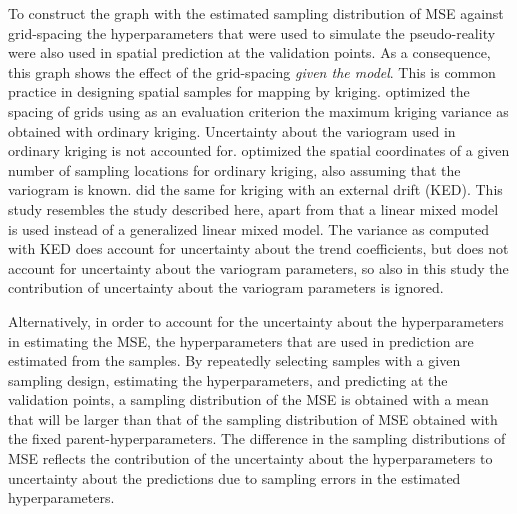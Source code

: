 \documentclass[review]{elsarticle}
\begin{document}
To construct the graph with the estimated sampling distribution of MSE against grid-spacing the hyperparameters that were used to simulate the pseudo-reality were also used in spatial prediction at the validation points. As a consequence, this graph shows the effect of the grid-spacing \emph{given the model}. This is common practice in designing spatial samples for mapping by kriging. \citet{mcbratney1981} optimized  the spacing of grids using as an evaluation criterion the maximum kriging variance as obtained with ordinary kriging. Uncertainty about the variogram used in ordinary kriging is not accounted for. 
\citet{vangroenigen1999} optimized the spatial coordinates of a given number of sampling locations for ordinary kriging, also assuming that the variogram is known. \citet{brus2007} did the same for kriging with an external drift (KED). This study resembles the study described here, apart from that a linear mixed model is used instead of a generalized linear mixed model. The variance as computed with KED does account for uncertainty about the trend coefficients, but does not account for uncertainty about the variogram parameters, so also in this study the contribution of uncertainty about the variogram parameters is ignored.

Alternatively, in order to account for the uncertainty about the hyperparameters in estimating the MSE, the hyperparameters that are used in prediction are estimated from the samples. By repeatedly selecting samples with a given sampling design, estimating the hyperparameters, and predicting at the validation points, a sampling distribution of the MSE is obtained with a mean that will be larger than that of the sampling distribution of MSE obtained with the fixed parent-hyperparameters. The difference in the sampling distributions of MSE reflects the contribution of the uncertainty about the hyperparameters to uncertainty about the predictions due to sampling errors in the estimated hyperparameters.
\end{document}
